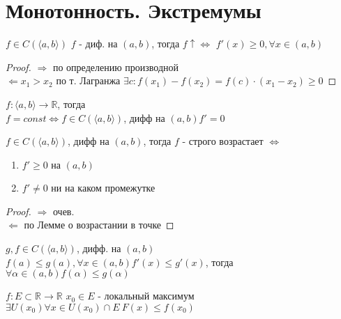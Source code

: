 \documentclass[12pt]{article}
\begin{document}
\section{Монотонность. Экстремумы}
\begin{theorem}
$f \in C(\langle a, b \rangle)$ $f$ - диф. на $(a, b)$, тогда $f \uparrow \Leftrightarrow$ $f'(x) \ge 0, \forall x \in (a, b)$
\end{theorem}
\begin{proof}
  $\Rightarrow$ по определению производной \\
  $\Leftarrow x_1 > x_2$ по т. Лагранжа $\exists c: f(x_1) - f(x_2) = f(c)\cdot(x_1 - x_2) \ge 0$ 
\end{proof}
\begin{corollary}
  $f: \langle a, b \rangle \rightarrow \mathbb{R}$, тогда \\
  $f = const \Leftrightarrow f \in C(\langle a, b \rangle )$, дифф на $(a, b) f' = 0$
\end{corollary}
\begin{corollary}
  $f \in C(\langle a, b \rangle)$, дифф на $(a, b)$, тогда $f$ - строго возрастает $\Leftrightarrow$
  \begin{enumerate}
  \item $f' \ge 0$ на $(a, b)$
  \item $f' \not = 0$ ни на каком промежутке
  \end{enumerate}
\end{corollary}
\begin{proof}
  $\Rightarrow$ очев. \\
  $\Leftarrow$ по Лемме о возрастании в точке
\end{proof}
\begin{corollary}
  $g, f \in C(\langle a, b \rangle)$, дифф. на $(a, b)$ $f(a) \le g(a), \forall x \in (a, b) f'(x) \le g'(x)$, тогда $\forall \alpha \in (a, b) f(\alpha) \le g(\alpha)$
\end{corollary}
\begin{definition}
  $f: E \subset \mathbb{R} \rightarrow \mathbb{R}$ $x_0 \in E$ - локальный максимум \\
  $\exists U(x_0) \forall x \in U(x_0) \cap E\ F(x) \le f(x_0)$
\end{definition}
\end{document}
